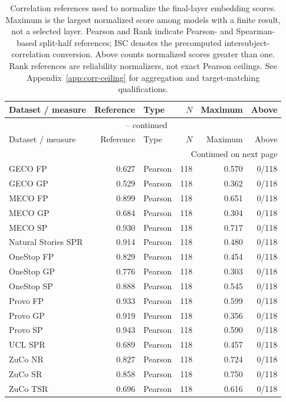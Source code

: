 {\small\setlength{\tabcolsep}{4pt}
\begin{longtable}{@{}lrlrrr@{}}
\caption{Correlation references used to normalize the final-layer embedding scores. Maximum is the largest normalized score among models with a finite result, not a selected layer. Pearson and Rank indicate Pearson- and Spearman-based split-half references; ISC denotes the precomputed intersubject-correlation conversion. Above counts normalized scores greater than one. Rank references are reliability normalizers, not exact Pearson ceilings. See Appendix~\ref{app:corr-ceiling} for aggregation and target-matching qualifications.}\label{tab:corr-ceilings} \\
\toprule
Dataset / measure & Reference & Type & $N$ & Maximum & Above \\
\midrule
\endfirsthead
\multicolumn{6}{c}{\tablename\ \thetable{} -- continued} \\
\toprule
Dataset / measure & Reference & Type & $N$ & Maximum & Above \\
\midrule
\endhead
\midrule\multicolumn{6}{r}{Continued on next page} \\
\endfoot
\bottomrule
\endlastfoot
GECO FP & 0.627 & Pearson & 118 & 0.570 & 0/118 \\
GECO GP & 0.529 & Pearson & 118 & 0.362 & 0/118 \\
MECO FP & 0.899 & Pearson & 118 & 0.651 & 0/118 \\
MECO GP & 0.684 & Pearson & 118 & 0.304 & 0/118 \\
MECO SP & 0.930 & Pearson & 118 & 0.717 & 0/118 \\
Natural Stories SPR & 0.914 & Pearson & 118 & 0.480 & 0/118 \\
OneStop FP & 0.829 & Pearson & 118 & 0.454 & 0/118 \\
OneStop GP & 0.776 & Pearson & 118 & 0.303 & 0/118 \\
OneStop SP & 0.888 & Pearson & 118 & 0.545 & 0/118 \\
Provo FP & 0.933 & Pearson & 118 & 0.599 & 0/118 \\
Provo GP & 0.919 & Pearson & 118 & 0.356 & 0/118 \\
Provo SP & 0.943 & Pearson & 118 & 0.590 & 0/118 \\
UCL SPR & 0.689 & Pearson & 118 & 0.457 & 0/118 \\
ZuCo NR & 0.827 & Pearson & 118 & 0.724 & 0/118 \\
ZuCo SR & 0.858 & Pearson & 118 & 0.750 & 0/118 \\
ZuCo TSR & 0.696 & Pearson & 118 & 0.616 & 0/118 \\

\end{longtable}}
